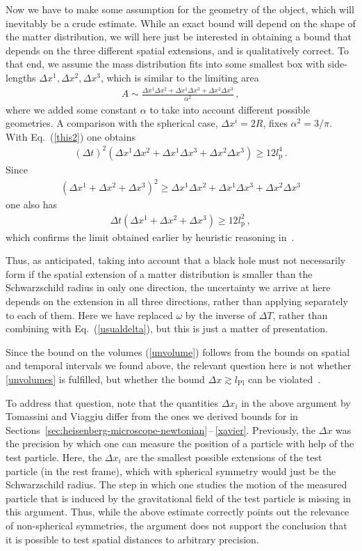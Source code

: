 \documentclass{article}
\def\beqn{\begin{eqnarray}}
\def\eeqn{\end{eqnarray}}
\begin{document}
Now we have to make some assumption for the geometry of the object, which will inevitably be a crude
estimate. While an exact bound will depend on the shape of the matter distribution, we will here
just be interested in obtaining a bound that depends on the three different spatial extensions, and
is qualitatively correct. To that end, we assume 
the mass distribution fits into some smallest box with side-lengths $\Delta x^1, \Delta x^2, \Delta x^3$, which
is similar to the limiting area
\beqn
A \sim \frac{\Delta x^1 \Delta x^2 + \Delta x^1 \Delta x^3 + \Delta x^2 \Delta x^3}{\alpha^2} \,,
\eeqn
where we added some constant $\alpha$ to take into account different possible geometries. A comparison with the 
spherical case, $\Delta x^i = 2 R$, fixes $\alpha^2 = 3/\pi$. With Eq.~(\ref{this2}) one obtains
\beqn
\left(\Delta t \right)^2 \left( \Delta x^1 \Delta x^2 + \Delta x^1 \Delta x^3 + \Delta x^2 \Delta x^3 \right) 
\geq 12 l_{\mathrm{p}}^4 \,.
\eeqn
Since 
\beqn
\left( \Delta x^1 + \Delta x^2 + \Delta x^3 \right)^2 \geq \Delta x^1 \Delta x^2 + \Delta x^1 \Delta x^3 + \Delta x^2 \Delta x^3 
\eeqn
one also has 
\beqn
\Delta t \left( \Delta x^1 + \Delta x^2 + \Delta x^3 \right) 
\label{unvolume}
\geq 12 l_{\mathrm{p}}^2 \,,
\eeqn
which confirms the limit obtained earlier by heuristic reasoning in~\cite{Doplicher:1994tu}.

Thus, as anticipated, taking into account that a black hole must not necessarily form if the spatial extension of a matter
distribution is smaller than the Schwarzschild radius in only one direction, the uncertainty we arrive at here depends on
the extension in all three directions, rather than applying separately to each of them. Here we have replaced $\omega$ by the 
inverse of $\Delta T$, rather than combining with Eq.~(\ref{usualdelta}), but this is just a matter of
presentation.

Since the bound on the volumes (\ref{unvolume}) follows from the bounds on spatial and temporal intervals we
found above, the relevant question here is not whether \ref{unvolumes} 
is fulfilled, but whether the bound $\Delta x \gtrsim l_{\mathrm{Pl}}$
can be violated~\cite{Hossenfelder:2012kk}. 

To address that question, note that the quantities $\Delta x_i$ in the above argument by Tomassini and Viaggiu 
differ from the
ones we derived bounds for in Sections~\ref{sec:heisenberg-microscope-newtonian}\,--\,\ref{xavier}.
Previously, the $\Delta x$
was the precision by which one can measure the position of a particle with help of the test particle. 
Here, the $\Delta x_i$ are the smallest possible extensions of the test particle (in the rest frame),
which with spherical symmetry would just be the Schwarzschild radius. The step in which one studies the motion of the measured particle that is induced by the gravitational 
field of the test particle is missing in this argument. Thus, while the above estimate correctly points out the relevance of
non-spherical symmetries, the argument does not support the conclusion that it is possible to
test spatial distances to arbitrary precision. 
\end{document}
